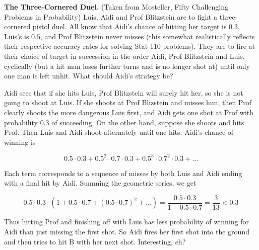 \documentclass[11pt]{article}
\begin{document}
\begin{exercise}
\textbf{The Three-Cornered Duel.} (Taken from Mosteller, Fifty Challenging Problems in Probability) Luis, Aidi and Prof Blitzstein are to fight a three-cornered pistol duel. All know that Aidi's chance of hitting her target is $0.3$, Luis's is $0.5$, and Prof Blitzstein never misses (this somewhat realistically reflects their respective accuracy rates for solving Stat 110 problems). They are to fire at their choice of target in succession in the order Aidi, Prof Blitzstein and Luis, cyclically (but a hit man loses further turns and is no longer shot at) until only one man is left unhit. What should Aidi's strategy be?
\end{exercise}
\begin{solution}
Aidi sees that if she hits Luis, Prof Blitzstein will surely hit her, so she is not going to shoot at Luis. If she shoots at Prof Blizstein and misses him, then Prof clearly shoots the more dangerous Luis first, and Aidi gets one shot at Prof with probability $0.3$ of succeeding. On the other hand, suppose she shoots and hits Prof. Then Luis and Aidi shoot alternately until one hits. Aidi's chance of winning is

$$0.5 \cdot 0.3 + 0.5^2 \cdot 0.7 \cdot 0.3 + 0.5^3 \cdot 0.7^2 \cdot 0.3 + ...$$

Each term corresponds to a sequence of misses by both Luis and Aidi ending with a final hit by Aidi. Summing the geometric series, we get

$$0.5 \cdot 0.3 \cdot (1 + 0.5 \cdot 0.7 + (0.5 \cdot 0.7)^2 + ...) = \frac{0.5 \cdot 0.3}{1 - 0.5 \cdot 0.7} = \frac{3}{13} < 0.3$$

Thus hitting Prof and finishing off with Luis has less probability of winning for Aidi than just missing the first shot. So Aidi fires her first shot into the ground and then tries to hit B with her next shot. Interesting, eh?

\end{solution}
\end{document}
